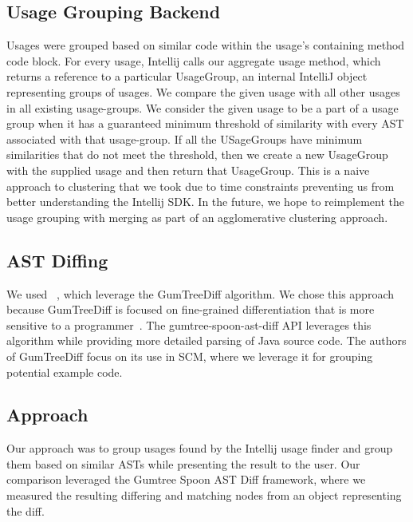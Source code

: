 \documentclass[conference]{IEEEtran}
\begin{document}
\subsection{Usage Grouping Backend} 
Usages were grouped based on similar code within the usage's containing method code block.  For every usage, Intellij calls our aggregate usage method, which returns a reference to a particular UsageGroup, an internal IntelliJ object representing groups of usages. We compare the given usage with all other usages in all existing usage-groups. We consider the given usage to be a part of a usage group when it has a guaranteed minimum threshold of similarity with every AST associated with that usage-group. If all the USageGroups have minimum similarities that do not meet the threshold, then we create a new UsageGroup with the supplied usage and then return that UsageGroup. This is a naive approach to clustering that we took due to time constraints preventing us from better understanding the Intellij SDK. In the future, we hope to reimplement the usage grouping with merging as part of an agglomerative clustering approach.

\subsection{AST Diffing}
We used ~\cite{spoonlabs_2019,falleri2014fine}, which leverage the GumTreeDiff algorithm. We chose this approach because GumTreeDiff is focused on fine-grained differentiation that is more sensitive to a programmer~\cite{falleri2014fine}. The gumtree-spoon-ast-diff API leverages this algorithm while providing more detailed parsing of Java source code. The authors of GumTreeDiff focus on its use in SCM, where we leverage it for grouping potential example code.


\subsection{Approach}
Our approach was to group usages found by the Intellij usage finder and group them based on similar ASTs while presenting the result to the user. Our comparison leveraged the Gumtree Spoon AST Diff framework, where we measured the resulting differing and matching nodes from an object representing the diff. 


\end{document}
